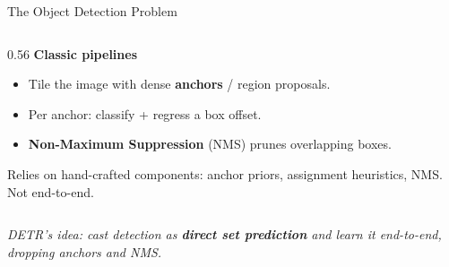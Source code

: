 \begin{frame}{The Object Detection Problem}
\begin{columns}[T]
\begin{column}{0.56\textwidth}
      \vspace{0.3em}
      \textbf{Classic pipelines} 
      \begin{itemize}
        \item Tile the image with dense \textbf{anchors} / region proposals.
        \item Per anchor: classify + regress a box offset.
        \item \textbf{Non-Maximum Suppression} (NMS) prunes overlapping boxes.
      \end{itemize}
      \vspace{0.2em}
      {\footnotesize Relies on hand-crafted components: anchor priors, assignment heuristics, NMS. Not end-to-end.}
    \end{column}
  \end{columns}

  \vspace{0.4em}
  \begin{center}
    \footnotesize\itshape DETR's idea: cast detection as \textbf{direct set prediction} and learn it end-to-end, dropping anchors and NMS.
  \end{center}
\end{frame}

